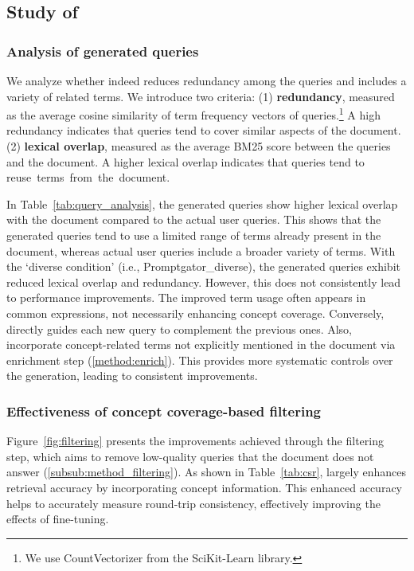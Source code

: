 \subsection{Study of \proposed}


\subsubsection{\textbf{Analysis of generated queries}}
\label{result:query_analysis}
We analyze whether \proposed indeed reduces redundancy among the queries and includes a variety of related terms.
We introduce two criteria: (1) \textbf{redundancy}, measured as the average cosine similarity of term frequency vectors of queries.\footnote{We use CountVectorizer from the SciKit-Learn library.}
A high redundancy indicates that queries tend to cover similar aspects of the document.
(2) \textbf{lexical overlap}, measured as the average BM25 score between the queries and the document.
A higher lexical overlap indicates that queries tend to reuse~terms~from~the~document.


In Table~\ref{tab:query_analysis}, the generated queries show higher lexical overlap with the document compared to the actual user queries.
This shows that the generated queries tend to use a limited range of terms already present in the document, whereas actual user queries include a broader variety of terms.
With the ‘diverse condition’ (i.e., Promptgator\_diverse), the generated queries exhibit reduced lexical overlap and redundancy. 
However, this does not consistently lead to performance improvements.
The improved term usage often appears in common expressions, not necessarily enhancing concept coverage.
Conversely, \proposed directly guides each new query to complement the previous ones.
Also, \proposed incorporate concept-related terms not explicitly mentioned in the document via enrichment step (\cref{method:enrich}).
This provides more systematic controls over the generation, leading to consistent improvements.



\subsubsection{\textbf{Effectiveness of concept coverage-based filtering}}
Figure~\ref{fig:filtering} presents the improvements achieved through the filtering step, which aims to remove low-quality queries that the document does not answer (\cref{subsub:method_filtering}).
As shown in Table~\ref{tab:csr}, \proposedtwo largely enhances retrieval accuracy by incorporating concept information.
This enhanced accuracy helps to accurately measure round-trip consistency, effectively improving the effects of fine-tuning.


